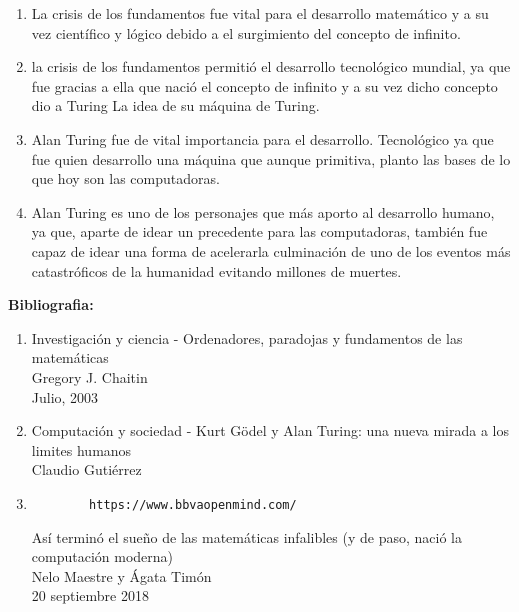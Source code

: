 \documentclass[12pt]{article}
\begin{document}
\begin{enumerate}
    \item La crisis de los fundamentos fue vital para el desarrollo matemático y a su vez científico y lógico debido a el surgimiento del concepto de infinito.
    \item la crisis de los fundamentos permitió el desarrollo tecnológico mundial, ya que fue gracias a ella que nació el concepto de infinito y a su vez dicho concepto dio a Turing La idea de su máquina de Turing.
    \item Alan Turing fue de vital importancia para el desarrollo. Tecnológico  ya que fue quien desarrollo una máquina que aunque primitiva, planto las bases de lo que hoy son las computadoras.
    \item Alan Turing es uno de los personajes que más aporto al desarrollo humano, ya que, aparte de idear un precedente para las computadoras, también fue capaz de idear una forma de acelerarla culminación de uno de los eventos más catastróficos de la humanidad evitando millones de muertes.
\end{enumerate}


\newpage

\begin{center}
\bf{\sc\Huge Bibliografia: }\\
\end{center}
\vspace{50pt}

\begin{enumerate}
    \item Investigación y ciencia  - Ordenadores, paradojas y fundamentos de las matemáticas\\
    Gregory J. Chaitin\\
    Julio, 2003
    
    \item Computación y sociedad - Kurt Gödel y Alan Turing: una nueva mirada a los limites humanos\\
    Claudio Gutiérrez
    
    \item \begin{verbatim}
        https://www.bbvaopenmind.com/
        \end{verbatim}
        
        
        Así terminó el sueño de las matemáticas infalibles (y de paso, nació la computación moderna)\\
        Nelo Maestre y Ágata Timón\\
        20 septiembre 2018





\end{enumerate}
\end{document}

